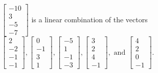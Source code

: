 \begin{exerciseAnswer}
\begin{enumerate}[(a)]
\( \left[\begin{array}{c}
-10 \\
3 \\
-5 \\
-7
\end{array}\right] \) is a linear combination of the vectors \( \left[\begin{array}{c}
2 \\
-2 \\
-1 \\
-1
\end{array}\right] , \left[\begin{array}{c}
0 \\
-1 \\
3 \\
1
\end{array}\right] , \left[\begin{array}{c}
-5 \\
1 \\
-1 \\
-3
\end{array}\right] , \left[\begin{array}{c}
3 \\
2 \\
4 \\
-1
\end{array}\right] , \text{ and } \left[\begin{array}{c}
4 \\
2 \\
0 \\
-1
\end{array}\right] \). 


\end{enumerate}
    
\end{exerciseAnswer}
    

